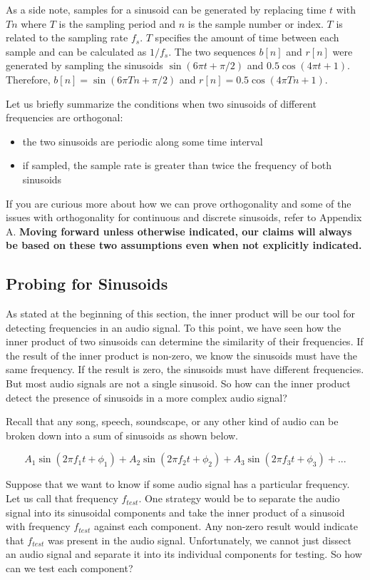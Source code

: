 As a side note, samples for a sinusoid can be generated by replacing time $t$ with $Tn$ where $T$ is
the sampling period and $n$ is the sample number or index.  $T$ is related to the sampling rate $f_s$.
$T$ specifies the amount of time between each sample and can be calculated as $1/f_s$.  The two
sequences $b[n]$ and $r[n]$ were generated by sampling the sinusoids $\sin(6\pi t + \pi/2)$ and
$0.5\cos(4\pi t + 1)$.  Therefore, $b[n] = \sin(6\pi Tn + \pi/2)$ and $r[n] = 0.5\cos(4\pi Tn + 1)$.

Let us briefly summarize the conditions when two sinusoids of different frequencies
are orthogonal:

\begin{itemize}
	\item the two sinusoids are periodic along some time interval
	\item if sampled, the sample rate is greater than twice the frequency of both sinusoids
\end{itemize}

If you are curious more about how we can prove orthogonality and some of the issues with orthogonality for
continuous and discrete sinusoids, refer to Appendix A.  \textbf{Moving forward unless otherwise indicated, our 
claims will always be based on these two assumptions even when not explicitly indicated.}

\subsection*{Probing for Sinusoids}

As stated at the beginning of this section, the inner product will be our tool for
detecting frequencies in an audio signal.  To this point, we have seen how the inner
product of two sinusoids can determine the similarity of their frequencies.  If the result
of the inner product is non-zero, we know the sinusoids must have the same frequency.
If the result is zero, the sinusoids must have different frequencies.  But most audio
signals are not a single sinusoid.  So how can the inner product detect the presence
of sinusoids in a more complex audio signal?

Recall that any song, speech, soundscape, or any other kind of audio can be broken down into a sum of 
sinusoids as shown below.

$$A_1\sin(2\pi f_1 t + \phi_1) + A_2\sin(2 \pi f_2 t + \phi_2) + A_3\sin(2 \pi f_3 t + \phi_3) + ...$$

\noindent Suppose that we want to know if some audio signal has a particular frequency.  Let us call that frequency
$f_{test}$.  One strategy would be to separate the audio signal into its sinusoidal components and take the inner product of a sinusoid with frequency $f_{test}$ against each component.  
Any non-zero result would indicate that $f_{test}$ was
present in the audio signal.  Unfortunately, we cannot just dissect an audio signal and separate it into its
individual components for testing.  So how can we test each component?

